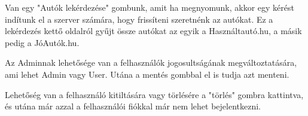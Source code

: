 Van egy "Autók lekérdezése" gombunk, amit ha megnyomunk,  akkor egy kérést indítunk el a szerver számára, hogy frissíteni szeretnénk az autókat. Ez a lekérdezés kettő oldalról gyűjt össze autókat az egyik a Használtautó.hu, a másik pedig a JóAutók.hu.

Az Adminnak lehetősége van a felhasználók jogosultságának megváltoztatására, ami lehet Admin vagy User. Utána a mentés gombbal el is tudja azt menteni.

Lehetőség van a felhasználó kitiltására vagy törlésére a "törlés" gombra kattintva, és utána már azzal a felhasználói fiókkal már nem lehet bejelentkezni.



